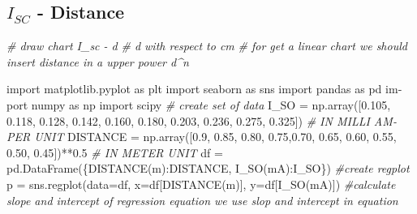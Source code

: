 \documentclass{article}
\newenvironment{Shaded}{}{}
\newcommand{\CommentTok}[1]{\textcolor[rgb]{0.38,0.63,0.69}{\textit{#1}}}
\newcommand{\FloatTok}[1]{\textcolor[rgb]{0.25,0.63,0.44}{#1}}
\newcommand{\ImportTok}[1]{#1}
\newcommand{\NormalTok}[1]{#1}
\newcommand{\OperatorTok}[1]{\textcolor[rgb]{0.40,0.40,0.40}{#1}}
\newcommand{\StringTok}[1]{\textcolor[rgb]{0.25,0.44,0.63}{#1}}
\begin{document}
\begin{latin}
\hypertarget{i_sc---distance}{%
\section{\texorpdfstring{\(I_{SC}\) -
Distance}{I\_\{SC\} - Distance}}\label{i_sc---distance}}
\begin{Shaded}
\begin{Highlighting}[]
\CommentTok{\# draw chart I\_sc {-} d }
\CommentTok{\# d with respect to cm}
\CommentTok{\# for get a linear chart we should insert distance in a upper power d\^{}n}
\end{Highlighting}
\end{Shaded}
\begin{Shaded}
\begin{Highlighting}[]
\ImportTok{import}\NormalTok{ matplotlib.pyplot }\ImportTok{as}\NormalTok{ plt}
\ImportTok{import}\NormalTok{ seaborn }\ImportTok{as}\NormalTok{ sns}
\ImportTok{import}\NormalTok{ pandas }\ImportTok{as}\NormalTok{ pd}
\ImportTok{import}\NormalTok{ numpy }\ImportTok{as}\NormalTok{ np}
\ImportTok{import}\NormalTok{ scipy}
\CommentTok{\# create set of data}
\NormalTok{I\_SO }\OperatorTok{=}\NormalTok{ np.array([}\FloatTok{0.105}\NormalTok{, }\FloatTok{0.118}\NormalTok{, }\FloatTok{0.128}\NormalTok{, }\FloatTok{0.142}\NormalTok{, }\FloatTok{0.160}\NormalTok{, }\FloatTok{0.180}\NormalTok{, }\FloatTok{0.203}\NormalTok{, }\FloatTok{0.236}\NormalTok{, }\FloatTok{0.275}\NormalTok{, }\FloatTok{0.325}\NormalTok{]) }\CommentTok{\# IN MILLI AMPER UNIT}
\NormalTok{DISTANCE }\OperatorTok{=}\NormalTok{ np.array([}\FloatTok{0.9}\NormalTok{, }\FloatTok{0.85}\NormalTok{, }\FloatTok{0.80}\NormalTok{, }\FloatTok{0.75}\NormalTok{,}\FloatTok{0.70}\NormalTok{, }\FloatTok{0.65}\NormalTok{, }\FloatTok{0.60}\NormalTok{, }\FloatTok{0.55}\NormalTok{, }\FloatTok{0.50}\NormalTok{, }\FloatTok{0.45}\NormalTok{])}\OperatorTok{**}\FloatTok{0.5} \CommentTok{\# IN METER UNIT}
\NormalTok{df }\OperatorTok{=}\NormalTok{ pd.DataFrame(\{}\StringTok{\textquotesingle{}DISTANCE(m)\textquotesingle{}}\NormalTok{:DISTANCE, }\StringTok{\textquotesingle{}I\_SO(mA)\textquotesingle{}}\NormalTok{:I\_SO\})}
\CommentTok{\#create regplot}
\NormalTok{p }\OperatorTok{=}\NormalTok{ sns.regplot(data}\OperatorTok{=}\NormalTok{df, x}\OperatorTok{=}\NormalTok{df[}\StringTok{\textquotesingle{}DISTANCE(m)\textquotesingle{}}\NormalTok{], y}\OperatorTok{=}\NormalTok{df[}\StringTok{\textquotesingle{}I\_SO(mA)\textquotesingle{}}\NormalTok{])}
\CommentTok{\#calculate slope and intercept of regression equation we use slop and intercept in equation}

\end{Highlighting}
\end{Shaded}
\end{latin}
\end{document}
